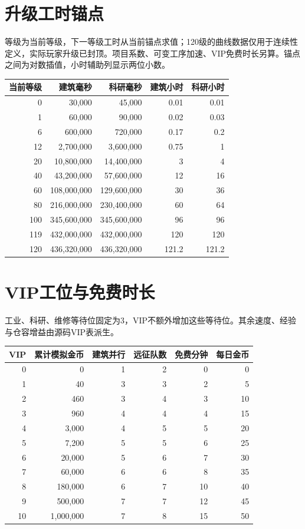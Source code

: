 \section{升级工时锚点}
等级为当前等级，下一等级工时从当前锚点求值；120级的曲线数据仅用于连续性定义，实际玩家升级已封顶。项目系数、可变工序加速、VIP免费时长另算。锚点之间为对数插值，小时辅助列显示两位小数。
\begin{small}
\begin{longtable}{@{}rrrrr@{}}
\toprule 当前等级 & 建筑毫秒 & 科研毫秒 & 建筑小时 & 科研小时 \\
\midrule\endhead
0 & 30,000 & 45,000 & 0.01 & 0.01 \\
1 & 60,000 & 90,000 & 0.02 & 0.03 \\
6 & 600,000 & 720,000 & 0.17 & 0.2 \\
12 & 2,700,000 & 3,600,000 & 0.75 & 1 \\
20 & 10,800,000 & 14,400,000 & 3 & 4 \\
40 & 43,200,000 & 57,600,000 & 12 & 16 \\
60 & 108,000,000 & 129,600,000 & 30 & 36 \\
80 & 216,000,000 & 230,400,000 & 60 & 64 \\
100 & 345,600,000 & 345,600,000 & 96 & 96 \\
119 & 432,000,000 & 432,000,000 & 120 & 120 \\
120 & 436,320,000 & 436,320,000 & 121.2 & 121.2 \\
\bottomrule
\end{longtable}
\end{small}
\Needspace{85mm}
\section{VIP工位与免费时长}
工业、科研、维修等待位固定为3，VIP不额外增加这些等待位。其余速度、经验与仓容增益由源码VIP表派生。
\begin{small}
\begin{longtable}{@{}rrrrrr@{}}
\toprule VIP & 累计模拟金币 & 建筑并行 & 远征队数 & 免费分钟 & 每日金币 \\
\midrule\endhead
0 & 0 & 1 & 2 & 0 & 0 \\
1 & 40 & 3 & 3 & 2 & 5 \\
2 & 460 & 3 & 4 & 3 & 10 \\
3 & 960 & 4 & 4 & 4 & 15 \\
4 & 3,000 & 4 & 5 & 5 & 20 \\
5 & 7,200 & 5 & 5 & 6 & 25 \\
6 & 20,000 & 5 & 6 & 7 & 30 \\
7 & 60,000 & 6 & 6 & 8 & 35 \\
8 & 180,000 & 6 & 7 & 10 & 40 \\
9 & 500,000 & 7 & 7 & 12 & 45 \\
10 & 1,000,000 & 7 & 8 & 15 & 50 \\
\bottomrule
\end{longtable}
\end{small}
